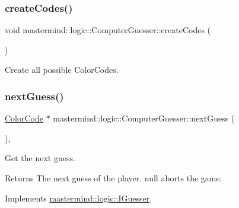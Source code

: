 \subsubsection{\texorpdfstring{create\+Codes()}{createCodes()}}
{\footnotesize\ttfamily void mastermind\+::logic\+::\+Computer\+Guesser\+::create\+Codes (\begin{DoxyParamCaption}{ }\end{DoxyParamCaption})\hspace{0.3cm}{\ttfamily [private]}}



Create all possible Color\+Codes. 

\hypertarget{classmastermind_1_1logic_1_1_computer_guesser_a5553cb2d63534927fbf9031c5d40c828}{}\label{classmastermind_1_1logic_1_1_computer_guesser_a5553cb2d63534927fbf9031c5d40c828} 
\subsubsection{\texorpdfstring{next\+Guess()}{nextGuess()}}
{\footnotesize\ttfamily \hyperlink{classmastermind_1_1logic_1_1_color_code}{Color\+Code} $\ast$ mastermind\+::logic\+::\+Computer\+Guesser\+::next\+Guess (\begin{DoxyParamCaption}{ }\end{DoxyParamCaption})\hspace{0.3cm}{\ttfamily [override]}, {\ttfamily [virtual]}}



Get the next guess. 

\begin{DoxyReturn}{Returns}
The next guess of the player. {\ttfamily null} aborts the game. 
\end{DoxyReturn}


Implements \hyperlink{classmastermind_1_1logic_1_1_i_guesser_a285f709f2076098acb5bc7c49a1435c7}{mastermind\+::logic\+::\+I\+Guesser}.

\hypertarget{classmastermind_1_1logic_1_1_computer_guesser_a728f55a5700d3574fc6b9207c9e8db7d}{}\label{classmastermind_1_1logic_1_1_computer_guesser_a728f55a5700d3574fc6b9207c9e8db7d} 
